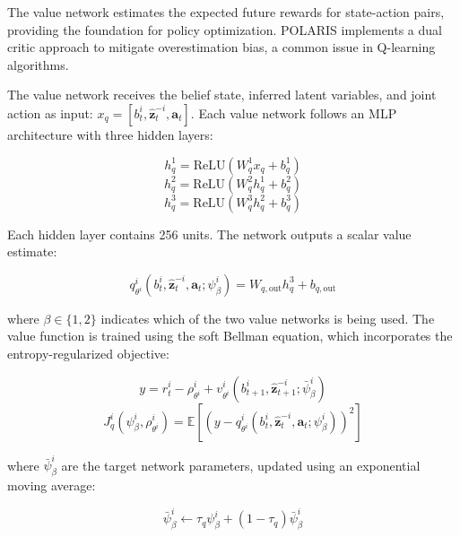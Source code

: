 The value network estimates the expected future rewards for state-action pairs, providing the foundation for policy optimization. POLARIS implements a dual critic approach to mitigate overestimation bias, a common issue in Q-learning algorithms.

The value network receives the belief state, inferred latent variables, and joint action as input: $x_{q} = [b^{i}_{t}, \hat{\boldsymbol{z}}^{-i}_{t}, \boldsymbol{a}_{t}]$. Each value network follows an MLP architecture with three hidden layers:

\begin{equation}
    h^1_{q} = \text{ReLU}(W^1_{q}x_{q} + b^1_{q})
\end{equation}
\begin{equation}
    h^2_{q} = \text{ReLU}(W^2_{q}h^1_{q} + b^2_{q})
\end{equation}
\begin{equation}
    h^3_{q} = \text{ReLU}(W^3_{q}h^2_{q} + b^3_{q})
\end{equation}

Each hidden layer contains 256 units. The network outputs a scalar value estimate:

\begin{equation}
    q^{i}_{\theta^i}(b^{i}_{t}, \hat{\boldsymbol{z}}^{-i}_{t}, \boldsymbol{a}_{t}; \psi^{i}_{\beta}) = W_{q,\text{out}}h^3_{q} + b_{q,\text{out}}
\end{equation}

where $\beta \in \{1, 2\}$ indicates which of the two value networks is being used. The value function is trained using the soft Bellman equation, which incorporates the entropy-regularized objective:

\begin{equation}
    y = r^{i}_{t} - \rho^{i}_{\theta^i} + v^{i}_{\theta^i}(b^{i}_{t+1}, \hat{\boldsymbol{z}}^{-i}_{t+1}; \bar{\psi}^{i}_{\beta})
\end{equation}
\begin{equation}
    J^{i}_{q}(\psi^{i}_{\beta}, \rho^{i}_{\theta^i}) = \mathbb{E}[(y - q^{i}_{\theta^i}(b^{i}_{t}, \hat{\boldsymbol{z}}^{-i}_{t}, \boldsymbol{a}_{t}; \psi^{i}_{\beta}))^{2}]
\end{equation}

where $\bar{\psi}^{i}_{\beta}$ are the target network parameters, updated using an exponential moving average:

\begin{equation}
    \bar{\psi}^{i}_{\beta} \leftarrow \tau_{q}\psi^{i}_{\beta} + (1 - \tau_{q})\bar{\psi}^{i}_{\beta}
\end{equation}

